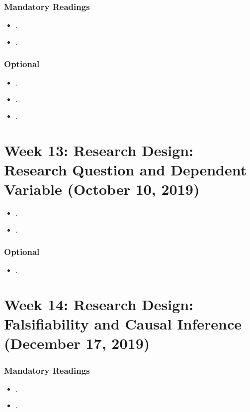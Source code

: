 \documentclass[abstract=on,parskip=full,headings=standardclasses,fontsize=11pt,paper=a4]{scrartcl}
\begin{document}
\subsubsection*{Mandatory Readings}
\begin{itemize}
\item {}.
\item {}.
\end{itemize}


\subsubsection*{Optional}
\begin{itemize}
\item {}.
\item {}.
\item {}.
\end{itemize}


\section{Week 13:  Research Design: Research Question and Dependent Variable  (October 10, 2019)}

\begin{itemize}
\renewcommand\labelitemi{--}
\item {}.
\item {}.
\end{itemize}

\subsubsection*{Optional}
\begin{itemize}
\item {}.
\end{itemize}

\section{Week 14: Research Design: Falsifiability and Causal Inference (December 17, 2019)}


\subsubsection*{Mandatory Readings}
\begin{itemize}
\item {}.
\item {}.
\end{itemize}
\end{document}
